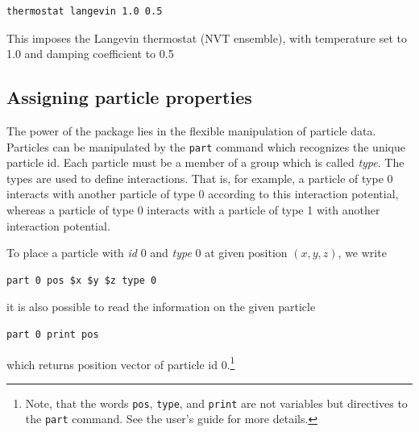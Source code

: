 \documentclass[
paper=a4,                       %
fontsize=11pt,                  %
twoside,                        %
footsepline,                    %
headsepline,                    %
headinclude=false,              %
footinclude=false,              %
pagesize,                       %
]{scrartcl}
\newtheorem{task}{Task}
\begin{document}
{\small\vspace{0,2cm}
\begin{lstlisting}[numbers=none]
thermostat langevin 1.0 0.5
\end{lstlisting}}\vspace{0,2cm}
\noindent This imposes the Langevin thermostat (NVT ensemble), with temperature set to 1.0 and damping coefficient to 0.5 

\subsection{\label{sec:partprop}Assigning particle properties}

The power of the \es{} package lies in the flexible manipulation of particle data. Particles can be manipulated by the \lstinline|part| command which recognizes the unique particle id. Each particle must be a member of a group which is called \emph{type}. The types are used to define interactions. That is, for example, a particle of type 0 interacts with another particle of type 0 according to this interaction potential, whereas a particle of type 0 interacts with a particle of type 1 with another interaction potential.

To place a particle with \emph{id} 0 and \emph{type} 0 at given position $(x,y,z)$, we write
   
{\small\vspace{0,2cm}
\begin{lstlisting}[numbers=none]
part 0 pos $x $y $z type 0
\end{lstlisting}\vspace{0,2cm}
}

\noindent it is also possible to read the information on the given particle

{\small\vspace{0,2cm}
\begin{lstlisting}[numbers=none]
part 0 print pos
\end{lstlisting}\vspace{0,2cm}
} 

\noindent which returns position vector of particle id 0.\footnote{Note, that the words \texttt{pos}, \texttt{type}, and \texttt{print} are not variables but directives to the \lstinline|part| command. See the \es{} user's guide for more details.}

\vspace{1cm}
\vspace{1cm}
\end{document}
